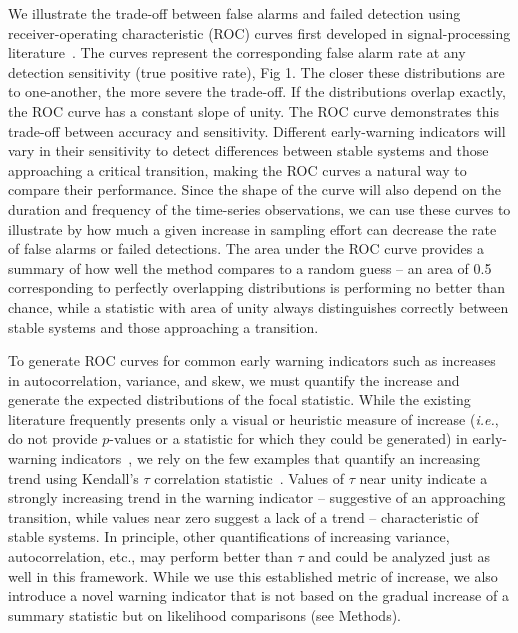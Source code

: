 \documentclass[authoryear,preprint,11pt]{elsarticle}
\begin{document}
We illustrate the trade-off between false alarms and failed detection using 
receiver-operating characteristic (ROC) curves first developed in signal-processing literature~\citep{Green1989, Keller2009}⁠. 
The curves represent the corresponding false alarm rate at any detection sensitivity (true positive rate), Fig 1.
The closer these distributions are to one-another, the more severe the trade-off.  
If the distributions overlap exactly, the ROC curve has a constant slope of unity.  
The ROC curve demonstrates this trade-off between accuracy and sensitivity.  
Different early-warning indicators will vary in their sensitivity to detect differences between stable systems and those approaching a critical transition, making the ROC curves a natural way to compare their performance.  
Since the shape of the curve will also depend on the duration and frequency of the time-series observations,
we can use these curves to illustrate by how much a given increase in sampling effort can decrease the rate of false alarms or failed detections.  
The area under the ROC curve provides a summary of how well the method compares to a random guess --
an area of 0.5 corresponding to perfectly overlapping distributions is performing no better than chance, while a statistic with area of unity always distinguishes correctly between stable systems and those approaching a transition. 

To generate ROC curves for common early warning indicators such as 
increases in autocorrelation, variance, and skew, 
we must quantify the increase and generate the expected distributions of the focal statistic.  
While the existing literature frequently presents only a 
visual or heuristic measure of increase (\emph{i.e.}, do not provide $p$-values or a statistic for which they could be generated) in early-warning indicators~\citep{Scheffer2009, Drake2010, Carpenter2011, Carpenter2006}, 
we rely on the few examples that quantify an increasing trend using Kendall's $\tau$ correlation statistic~\citep{Dakos2008, Dakos2011, Dakos2009}.
Values of $\tau$ near unity indicate a strongly increasing trend in the warning indicator --
suggestive of an approaching transition, while values near zero suggest a lack of a trend -- characteristic of stable systems.
In principle, other quantifications of increasing variance, autocorrelation, etc.,
may perform better than $\tau$ and could be analyzed just as well in this framework. 
While we use this established metric of increase, we also introduce a novel warning indicator
that is not based on the gradual increase of a summary statistic but on likelihood comparisons (see Methods).  
\end{document}
